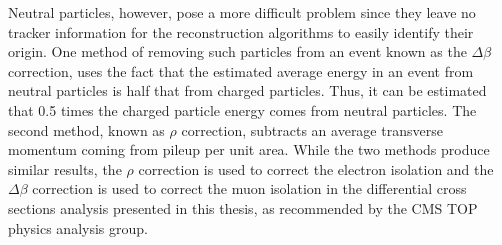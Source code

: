 Neutral particles, however, pose a more difficult problem since they leave no tracker information for the
reconstruction algorithms to easily identify their origin. One method of removing such particles from an event
known as the $\Delta\beta$ correction, uses the fact that the estimated average energy in an event from
neutral particles is half that from charged particles. Thus, it can be estimated that 0.5 times the charged particle
energy comes from neutral particles. The second method, known as $\rho$ correction, subtracts an average
transverse momentum coming from pileup per unit area. While the two methods produce similar results, the
$\rho$ correction is used to correct the electron isolation and the $\Delta\beta$ correction is used to correct the
muon isolation in the differential cross sections analysis presented in this thesis, as recommended by the CMS
TOP physics analysis group.
